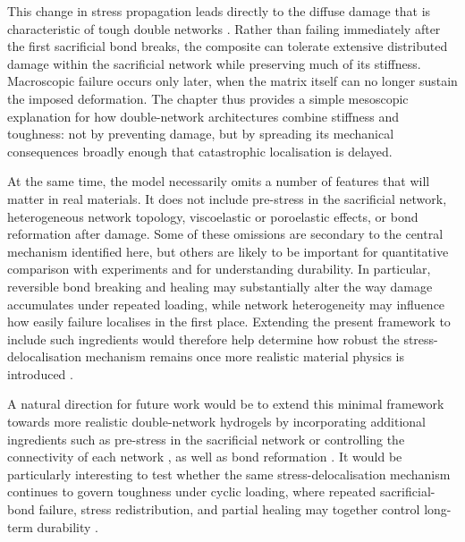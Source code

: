 This change in stress propagation leads directly to the diffuse damage that is characteristic of tough double networks \cite{millereauMechanicsElastomericMolecular2018,fukao_effect_2020,ju_role_nodate}. Rather than failing immediately after the first sacrificial bond breaks, the composite can tolerate extensive distributed damage within the sacrificial network while preserving much of its stiffness. Macroscopic failure occurs only later, when the matrix itself can no longer sustain the imposed deformation. The chapter thus provides a simple mesoscopic explanation for how double-network architectures combine stiffness and toughness: not by preventing damage, but by spreading its mechanical consequences broadly enough that catastrophic localisation is delayed.

At the same time, the model necessarily omits a number of features that will matter in real materials. It does not include pre-stress in the sacrificial network, heterogeneous network topology, viscoelastic or poroelastic effects, or bond reformation after damage. Some of these omissions are secondary to the central mechanism identified here, but others are likely to be important for quantitative comparison with experiments and for understanding durability. In particular, reversible bond breaking and healing may substantially alter the way damage accumulates under repeated loading, while network heterogeneity may influence how easily failure localises in the first place. Extending the present framework to include such ingredients would therefore help determine how robust the stress-delocalisation mechanism remains once more realistic material physics is introduced \cite{gong_why_2010,shivers_strain-controlled_2023,wangRapidSelfstrengtheningDoublenetwork2025,yasuiRateIndependentSelfHealingDouble2022,yinSelfHealingHydrogelsSynthesis2023}.

A natural direction for future work would be to extend this minimal framework towards more realistic double-network hydrogels by incorporating additional ingredients such as pre-stress in the sacrificial network or controlling the connectivity of each network \cite{gong_why_2010,shivers_strain-controlled_2023}, as well as bond reformation \cite{wangRapidSelfstrengtheningDoublenetwork2025,yasuiRateIndependentSelfHealingDouble2022,yinSelfHealingHydrogelsSynthesis2023}. It would be particularly interesting to test whether the same stress-delocalisation mechanism continues to govern toughness under cyclic loading, where repeated sacrificial-bond failure, stress redistribution, and partial healing may together control long-term durability \cite{zhang_fatigue_2018,chen_improvement_2016,chen_novel_2015,you_damage_2025}.

